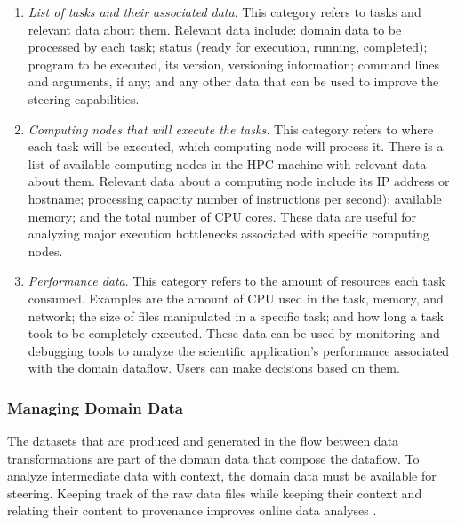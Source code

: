 \begin{enumerate}[label=(\roman*),itemsep=0pt]

\item \textit{List of tasks and their associated data}. This category
refers to tasks and relevant data about them. Relevant data include: domain data to be
processed by each task; status (ready for execution, running,
completed); program to be executed, its version, versioning information; command lines and arguments,
if any; and any other data that can be used to improve the steering capabilities.

\item \textit{Computing nodes that will execute the tasks.} This category refers to where each task will be executed,
\ie{} which computing node will process it. There is a list of
available computing nodes in the HPC machine with relevant data about
them. Relevant data about a computing node
include its IP address or hostname; processing capacity
\eg{} number of instructions per second); available memory; and
the total number of CPU cores. These data are useful for analyzing major execution bottlenecks associated with specific computing nodes.

\item \textit{Performance data}. This category refers to the
amount of resources each task consumed. Examples are the amount of CPU used in the task,
memory, and network; the size of files manipulated in a specific task; and
how long a task took to be completely executed. These data can be
used by monitoring and debugging tools to analyze the scientific
application's performance associated with the domain dataflow. Users can make decisions based on them.

\end{enumerate}

\subsubsection{Managing Domain Data}

The datasets that are produced and generated in the flow between data transformations are part of the domain data that compose the dataflow. To analyze intermediate data with context, the domain data must be available for steering. Keeping track of the raw data files while keeping their context and relating their content to provenance improves online data analyses \cite{Silva2017Raw}.


